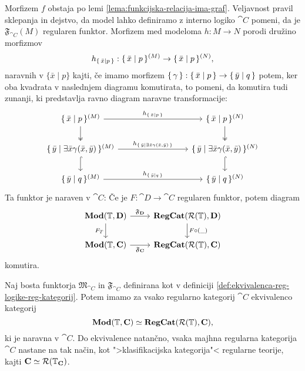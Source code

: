 \documentclass[../kategoricna_logika.tex]{subfiles}
\begin{document}
Morfizem $f$ obstaja po lemi \ref{lema:funkcijska-relacija-ima-graf}.
Veljavnost pravil sklepanja in dejstvo, da model lahko definiramo z
interno logiko $\cat{C}$ pomeni, da je $\mathfrak{F}_{\cat{C}}(M)$
regularen funktor.  Morfizem med modeloma $h : M \to N$ porodi družino
morfizmov
$$h_{\lbrace\,\bar{x} \mid  p\,\rbrace} : \lbrace\,\bar{x} \mid  p\,\rbrace^{(M)} \to \lbrace\,\bar{x} \mid  p\,\rbrace^{(N)},$$
naravnih v $\{\bar{x} \mid p\}$ kajti, če imamo morfizem
$\lbrace\,\gamma\,\rbrace : \lbrace\,\bar{x} \mid  p\,\rbrace \to
\lbrace\,\bar{y} \mid  q\,\rbrace$ potem, ker oba kvadrata v naslednjem
diagramu komutirata, to pomeni, da komutira tudi zunanji, ki
predstavlja ravno diagram naravne transformacije:
\begin{equation*}
  \begin{tikzcd}[column sep=3cm]
    \set{\bar{x} \mid  p}^{(M)} \ar[d, two heads] \ar[r, "h_{\set{\bar{x} \mid  p}}"] & \set{\bar{x} \mid  p}^{(N)} \ar[d, two heads] \\
    \set{\bar{y} \mid  \exists \bar{x} \gamma(\bar{x}, \bar{y})}^{(M)}  \ar[d, hook] \ar[r, "h_{\set{\bar{y} \mid  \exists \bar{x} \gamma(\bar{x}, \bar{y})}}"] & \set{\bar{y} \mid  \exists \bar{x} \gamma(\bar{x}, \bar{y})}^{(N)} \ar[d, hook] \\
    \set{\bar{y} \mid  q}^{(M)} \ar[r,
    "h_{\set{\bar{y} \mid  q}}"] & \set{\bar{y} \mid  q}^{(N)}
  \end{tikzcd}
\end{equation*}
Ta funktor je naraven v $\cat{C}$: Če je $F : \cat{D} \to \cat{C}$
regularen funktor, potem diagram
\begin{equation}\label{diag:naravnost-F}
  \begin{tikzcd}
    \Mod(\T, \cat{D}) \ar[d, "F_T"'] \ar[r, "\mathfrak{F}_{\cat{D}}"] & \cat{RegCat}(\mathcal{R}(\T), \cat{D}) \ar[d, "F \circ (\_)"] \\
    \Mod(\T, \cat{C}) \ar[r, "\mathfrak{F}_{\cat{C}}"'] &
    \cat{RegCat}(\mathcal{R}(\T), \cat{C})
  \end{tikzcd}
\end{equation}
komutira.
\begin{izrek}
  Naj bosta funktorja $\mathfrak{M}_{\cat{C}}$ in
  $\mathfrak{F}_{\cat{C}}$ definirana kot v definiciji
  \ref{def:ekvivalenca-reg-logike-reg-kategorij}. Potem imamo za vsako
  regularno kategorij $\cat{C}$ ekvivalenco kategorij
  $$\mathbf{Mod}(\mathbb{T}, {\operatorname{\mathbf{C}}}) \simeq {\operatorname{\mathbf{RegCat}}}(\mathcal{R}(\mathbb{T}), {\operatorname{\mathbf{C}}}),$$
  ki je naravna v $\cat{C}$. Do ekvivalence natančno, vsaka majhna
  regularna kategorija $\cat{C}$ nastane na tak način, kot
  ">klasifikacijska kategorija"< regularne teorije, kajti
  ${\operatorname{\mathbf{C}}} \simeq \mathcal{R}(\mathbb{T}_{{\operatorname{\mathbf{C}}}})$.
\end{izrek}
\end{document}
